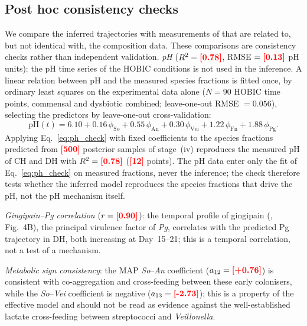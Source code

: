 \documentclass[pdflatex,sn-mathphys-ay,lineno]{sn-jnl}%
\newcommand{\TBD}[1]{\textcolor{red}{\textbf{[#1]}}}
\begin{document}
\subsection{Post hoc consistency checks}
\label{sec:validation}

We compare the inferred trajectories with measurements of \citet{heine2025influence} that are related to, but not identical with, the composition data.
These comparisons are consistency checks rather than independent validation.
\textit{pH} ($R^2=\TBD{0.78}$, RMSE $=\TBD{0.13}$ pH units):
the pH time series of the HOBIC conditions is not used in the inference.
A linear relation between pH and the measured species fractions is fitted once, by ordinary least squares on the experimental data alone ($N=90$ HOBIC time points, commensal and dysbiotic combined; leave-one-out RMSE $=0.056$), selecting the predictors by leave-one-out cross-validation:
\begin{equation}
  \mathrm{pH}(t) = 6.10 + 0.16\,\phi_{\mathrm{So}} + 0.55\,\phi_{\mathrm{An}} + 0.30\,\phi_{\mathrm{Vei}} + 1.22\,\phi_{\mathrm{Fn}} + 1.88\,\phi_{\mathrm{Pg}}.
  \label{eq:ph_check}
\end{equation}
Applying Eq.~\eqref{eq:ph_check} with fixed coefficients to the species fractions predicted from \TBD{500} posterior samples of stage~(iv) reproduces the measured pH of CH and DH with $R^2=\TBD{0.78}$ (\TBD{12} points).
The pH data enter only the fit of Eq.~\eqref{eq:ph_check} on measured fractions, never the inference; the check therefore tests whether the inferred model reproduces the species fractions that drive the pH, not the pH mechanism itself.

\textit{Gingipain--\textit{Pg} correlation} ($r=\TBD{0.90}$):
the temporal profile of gingipain (\citealp{heine2025influence}, Fig.~4B), the principal virulence factor of \textit{Pg}, correlates with the predicted Pg trajectory in DH, both increasing at Day~15--21; this is a temporal correlation, not a test of a mechanism.

\textit{Metabolic sign consistency}:
the MAP \textit{So}--\textit{An} coefficient ($a_{12}=\TBD{+0.76}$) is consistent with co-aggregation and cross-feeding between these early colonisers, while the \textit{So}--\textit{Vei} coefficient is negative ($a_{13}=\TBD{-2.73}$); this is a property of the effective model and should not be read as evidence against the well-established lactate cross-feeding between streptococci and \textit{Veillonella}.
\end{document}
